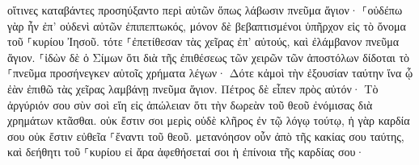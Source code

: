 \documentclass{openreader}
\begin{document}
οἵτινες καταβάντες προσηύξαντο περὶ αὐτῶν ὅπως λάβωσιν πνεῦμα ἅγιον· 
⸀οὐδέπω γὰρ ἦν ἐπ’ οὐδενὶ αὐτῶν ἐπιπεπτωκός, μόνον δὲ βεβαπτισμένοι ὑπῆρχον εἰς τὸ ὄνομα τοῦ ⸀κυρίου Ἰησοῦ. 
τότε ⸀ἐπετίθεσαν τὰς χεῖρας ἐπ’ αὐτούς, καὶ ἐλάμβανον πνεῦμα ἅγιον. 
⸀ἰδὼν δὲ ὁ Σίμων ὅτι διὰ τῆς ἐπιθέσεως τῶν χειρῶν τῶν ἀποστόλων δίδοται τὸ ⸀πνεῦμα προσήνεγκεν αὐτοῖς χρήματα 
λέγων· Δότε κἀμοὶ τὴν ἐξουσίαν ταύτην ἵνα ᾧ ἐὰν ἐπιθῶ τὰς χεῖρας λαμβάνῃ πνεῦμα ἅγιον. 
Πέτρος δὲ εἶπεν πρὸς αὐτόν· Τὸ ἀργύριόν σου σὺν σοὶ εἴη εἰς ἀπώλειαν ὅτι τὴν δωρεὰν τοῦ θεοῦ ἐνόμισας διὰ χρημάτων κτᾶσθαι. 
οὐκ ἔστιν σοι μερὶς οὐδὲ κλῆρος ἐν τῷ λόγῳ τούτῳ, ἡ γὰρ καρδία σου οὐκ ἔστιν εὐθεῖα ⸀ἔναντι τοῦ θεοῦ. 
μετανόησον οὖν ἀπὸ τῆς κακίας σου ταύτης, καὶ δεήθητι τοῦ ⸀κυρίου εἰ ἄρα ἀφεθήσεταί σοι ἡ ἐπίνοια τῆς καρδίας σου· 
\end{document}
